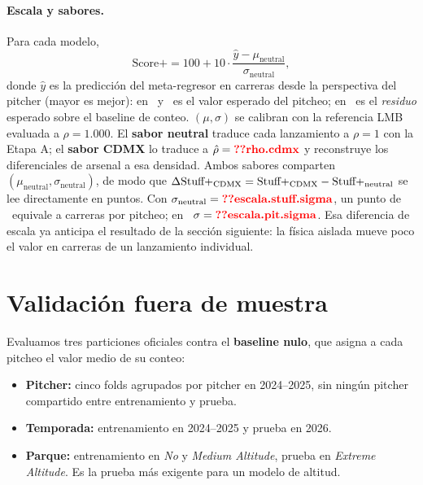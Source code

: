 \documentclass[10pt]{article}
\begin{document}
\paragraph{Escala y sabores.} Para cada modelo,
\[
\text{Score+} = 100 + 10\cdot\frac{\hat y - \mu_{\text{neutral}}}{\sigma_{\text{neutral}}},
\]
donde $\hat y$ es la predicción del meta-regresor en carreras desde la perspectiva del pitcher (mayor es mejor): en \lplus\ y \pplus\ es el valor esperado del pitcheo; en \splus\ es el \emph{residuo} esperado sobre el baseline de conteo. $(\mu,\sigma)$ se calibran con la referencia LMB evaluada a $\rho=1.000$. El \textbf{sabor neutral} traduce cada lanzamiento a $\rho=1$ con la Etapa A; el \textbf{sabor CDMX} lo traduce a $\rhohat=\cf{rho.cdmx}$ y reconstruye los diferenciales de arsenal a esa densidad. Ambos sabores comparten $(\mu_{\text{neutral}},\sigma_{\text{neutral}})$, de modo que $\Delta\text{Stuff+}_{\text{CDMX}} = \text{Stuff+}_{\text{CDMX}} - \text{Stuff+}_{\text{neutral}}$ se lee directamente en puntos. Con $\sigma_{\text{neutral}}=\cf{escala.stuff.sigma}$, un punto de \splus\ equivale a  carreras por pitcheo; en \pplus\ $\sigma=\cf{escala.pit.sigma}$. Esa diferencia de escala ya anticipa el resultado de la sección siguiente: la física aislada mueve poco el valor en carreras de un lanzamiento individual.

\section{Validación fuera de muestra}
\label{sec:val}

Evaluamos tres particiones oficiales contra el \textbf{baseline nulo}, que asigna a cada pitcheo el valor medio de su conteo:
\begin{itemize}
  \item \textbf{Pitcher:} cinco folds agrupados por pitcher en 2024--2025, sin ningún pitcher compartido entre entrenamiento y prueba.
  \item \textbf{Temporada:} entrenamiento en 2024--2025 y prueba en 2026.
  \item \textbf{Parque:} entrenamiento en \emph{No} y \emph{Medium Altitude}, prueba en \emph{Extreme Altitude}. Es la prueba más exigente para un modelo de altitud.
\end{itemize}

\begin{table}[htbp]\centering\small
\caption{Métricas fuera de muestra (los folds de pitcher se promedian). RMSE y correlación de Pearson contra el \texttt{xrv\_pitcher} observado; LL = log-loss del target binario. Menor RMSE/LL y mayor $r$ es mejor.}\label{tab:holdouts}
\end{table}
\end{document}
